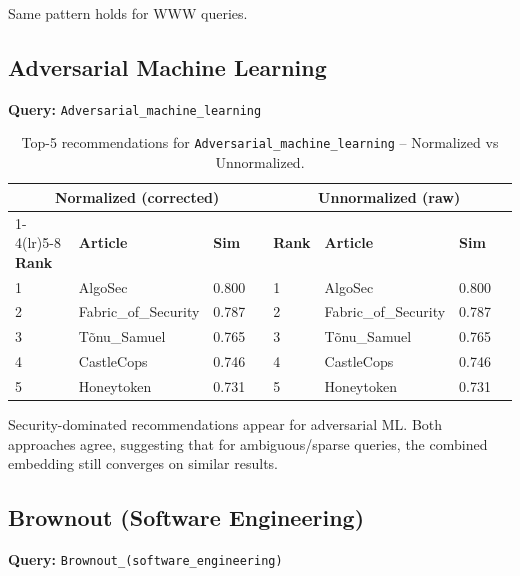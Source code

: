 \documentclass[12pt,a4paper]{article}
\begin{document}
Same pattern holds for WWW queries.

\subsection{Adversarial Machine Learning}

\textbf{Query:} \texttt{Adversarial\_machine\_learning}

\begin{table}[H]
\centering
\caption{Top-5 recommendations for \texttt{Adversarial\_machine\_learning} -- Normalized vs Unnormalized.}
\label{tab:aml}
\begin{tabular}{lllr|lllr}
\toprule
\multicolumn{4}{c}{\textbf{Normalized (corrected)}} & \multicolumn{4}{c}{\textbf{Unnormalized (raw)}} \\
\cmidrule(lr){1-4}\cmidrule(lr){5-8}
\textbf{Rank} & \textbf{Article} & \textbf{Sim} & & \textbf{Rank} & \textbf{Article} & \textbf{Sim} \\
\midrule
1 & AlgoSec & 0.800 & & 1 & AlgoSec & 0.800 \\
2 & Fabric\_of\_Security & 0.787 & & 2 & Fabric\_of\_Security & 0.787 \\
3 & Tõnu\_Samuel & 0.765 & & 3 & Tõnu\_Samuel & 0.765 \\
4 & CastleCops & 0.746 & & 4 & CastleCops & 0.746 \\
5 & Honeytoken & 0.731 & & 5 & Honeytoken & 0.731 \\
\bottomrule
\end{tabular}
\end{table}

Security-dominated recommendations appear for adversarial ML.  Both approaches
agree, suggesting that for ambiguous/sparse queries, the combined embedding
still converges on similar results.

\subsection{Brownout (Software Engineering)}

\textbf{Query:} \texttt{Brownout\_(software\_engineering)}
\end{document}
